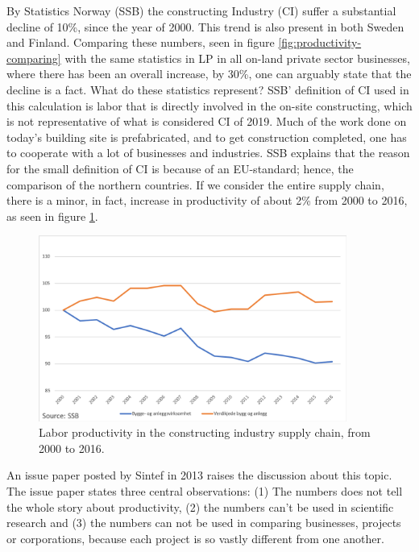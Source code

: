 By Statistics Norway (SSB) the constructing Industry (CI) suffer a substantial decline of 10\%, since the year of 2000. This trend is also present in both Sweden and Finland. Comparing these numbers, seen in figure \ref{fig:productivity-comparing} with the same statistics in LP in all on-land private sector businesses, where there has been an overall increase, by 30\%, one can arguably state that the decline is a fact. What do these statistics represent? SSB' definition of CI used in this calculation is labor that is directly involved in the on-site constructing, which is not representative of what is considered CI of 2019. Much of the work done on today's building site is prefabricated, and to get construction completed, one has to cooperate with a lot of businesses and industries. SSB explains that the reason for the small definition of CI is because of an EU-standard; hence, the comparison of the northern countries. If we consider the entire supply chain, there is a minor, in fact, increase in productivity of about 2\% from 2000 to 2016, as seen in figure \ref{fig:LP_supply_chain}.

\begin{figure}
    \centering
    \includegraphics[width=0.9\textwidth]{fig/ba_value_chain.png}
    \caption{Labor productivity in the constructing industry supply chain, from 2000 to 2016.}
    \label{fig:LP_supply_chain}
\end{figure}

An issue paper posted by Sintef in 2013 raises the discussion about this topic. The issue paper states three central observations: (1) The numbers does not tell the whole story about productivity, (2) the numbers can’t be used in scientific research and (3) the numbers can not be used in comparing businesses, projects or corporations, because each project is so vastly different from one another. 


